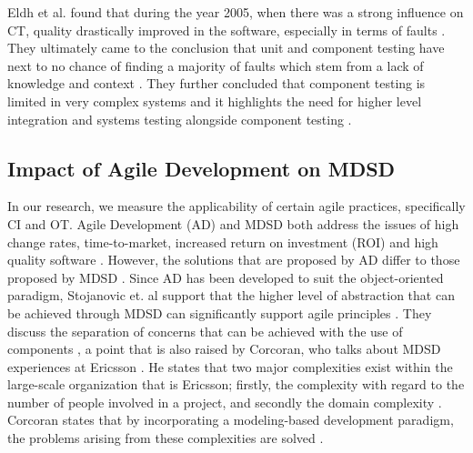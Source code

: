 \documentclass[fina_report_innit.tex]{subfiles}
\begin{document}
Eldh et al. found that during the year 2005, when there was a strong influence on CT, quality drastically improved in the software, especially in terms of faults \cite{eldh2007component}. They ultimately came to the conclusion that unit and component testing have next to no chance of finding a majority of faults which stem from a lack of knowledge and context \cite{eldh2007component}. They further concluded that component testing is limited in very complex systems and it highlights the need for higher level integration and systems testing alongside component testing \cite{eldh2007component}.

\subsection{Impact of Agile Development on MDSD}

In our research, we measure the applicability of certain agile practices, specifically CI and OT. Agile Development (AD) and MDSD both address the issues of high change rates, time-to-market, increased return on investment (ROI) and high quality software \cite{stojanovic2003component}. However, the solutions that are proposed by AD differ to those proposed by MDSD \cite{stojanovic2003component}. Since AD has been developed to suit the object-oriented paradigm, Stojanovic et. al support that the higher level of abstraction that can be achieved through MDSD can significantly support agile principles \cite{stojanovic2003component}. They discuss the separation of concerns that can be achieved with the use of components \cite{stojanovic2003component}, a point that is also raised by Corcoran, who talks about MDSD experiences at Ericsson \cite{selic2010modelling}. He states that two major complexities exist within the large-scale organization that is Ericsson; firstly, the complexity with regard to the number of people involved in a project, and secondly the domain complexity \cite{selic2010modelling}. Corcoran states that by incorporating a modeling-based development paradigm, the problems arising from these complexities are solved \cite{selic2010modelling}. 
\\
\end{document}
